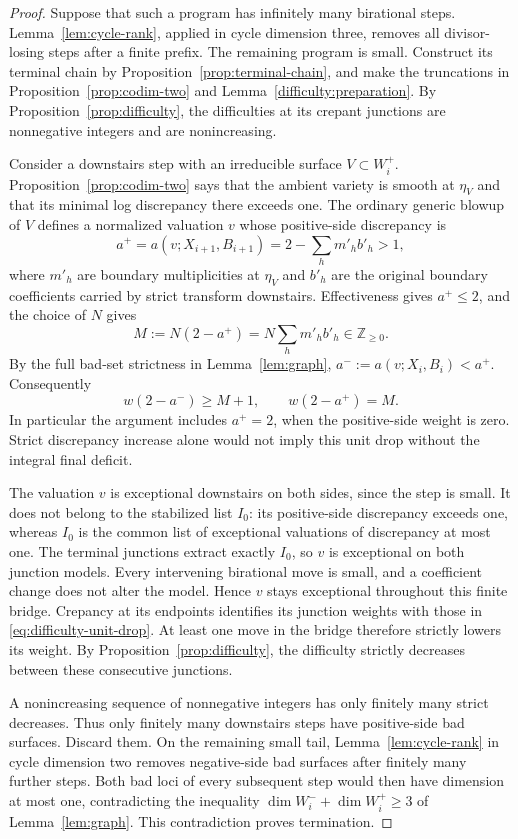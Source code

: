 \begin{proof}
Suppose that such a program has infinitely many birational steps.
Lemma~\ref{lem:cycle-rank}, applied in cycle dimension three,
removes all divisor-losing steps after a finite prefix.  The
remaining program is small.  Construct its terminal chain by
Proposition~\ref{prop:terminal-chain}, and make the truncations in
Proposition~\ref{prop:codim-two} and
Lemma~\ref{difficulty:preparation}.  By
Proposition~\ref{prop:difficulty}, the difficulties at its crepant
junctions are nonnegative integers and are nonincreasing.

Consider a downstairs step with an irreducible surface
\(V\subset W_i^+\).  Proposition~\ref{prop:codim-two} says that
the ambient variety is smooth at \(\eta_V\) and that its
minimal log discrepancy there exceeds one.  The ordinary generic
blowup of \(V\) defines a normalized valuation \(v\) whose
positive-side discrepancy is
\[
 a^+=a(v;X_{i+1},B_{i+1})
     =2-\sum_hm'_h b'_h>1,
\]
where \(m'_h\) are boundary multiplicities at \(\eta_V\) and
\(b'_h\) are the original boundary coefficients carried by strict
transform downstairs.  Effectiveness gives \(a^+\leq2\), and
the choice of \(N\) gives
\[
 M:=N(2-a^+)=N\sum_hm'_h b'_h\in\mathbb Z_{\geq0}.
\]
By the full bad-set strictness in Lemma~\ref{lem:graph},
\(a^-:=a(v;X_i,B_i)<a^+\).  Consequently
\begin{equation}
\label{eq:difficulty-unit-drop}
 w(2-a^-)\geq M+1,
 \qquad w(2-a^+)=M.
\end{equation}
In particular the argument includes \(a^+=2\), when the
positive-side weight is zero.  Strict discrepancy increase alone
would not imply this unit drop without the integral final deficit.

The valuation \(v\) is exceptional downstairs on both sides,
since the step is small.  It does not belong to the stabilized list
\(I_0\): its positive-side discrepancy exceeds one, whereas
\(I_0\) is the common list of exceptional valuations of discrepancy
at most one.  The terminal junctions extract exactly \(I_0\), so
\(v\) is exceptional on both junction models.  Every intervening
birational move is small, and a coefficient change does not alter
the model.  Hence \(v\) stays exceptional throughout this finite
bridge.  Crepancy at its endpoints identifies its junction weights
with those in \eqref{eq:difficulty-unit-drop}.  At least one move
in the bridge therefore strictly lowers its weight.  By
Proposition~\ref{prop:difficulty}, the difficulty strictly decreases
between these consecutive junctions.

A nonincreasing sequence of nonnegative integers has only finitely
many strict decreases.  Thus only finitely many downstairs steps
have positive-side bad surfaces.  Discard them.  On the remaining
small tail, Lemma~\ref{lem:cycle-rank} in cycle dimension two
removes negative-side bad surfaces after finitely many further
steps.  Both bad loci of every subsequent step would then have
dimension at most one, contradicting the inequality
\(\dim W_i^-+\dim W_i^+\geq3\) of Lemma~\ref{lem:graph}.
This contradiction proves termination.
\end{proof}

